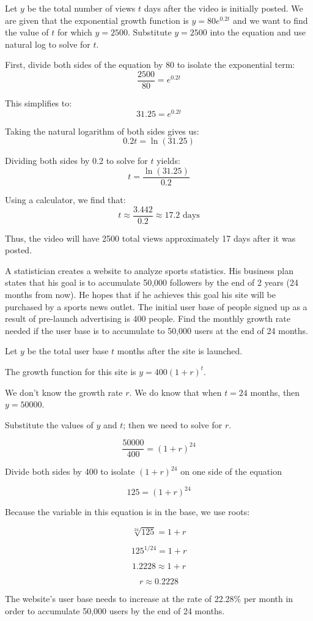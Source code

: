 \begin{solution}
    Let \( y \) be the total number of views \( t \) days after the video is initially posted. We are given that the exponential growth function is \( y = 80e^{0.2t} \) and we want to find the value of \( t \) for which \( y = 2500 \). Substitute \( y = 2500 \) into the equation and use natural log to solve for \( t \).

    First, divide both sides of the equation by 80 to isolate the exponential term:
    \[ \frac{2500}{80} = e^{0.2t} \]

    This simplifies to:
    \[ 31.25 = e^{0.2t} \]

    Taking the natural logarithm of both sides gives us:
    \[ 0.2t = \ln(31.25) \]

    Dividing both sides by 0.2 to solve for \( t \) yields:
    \[ t = \frac{\ln(31.25)}{0.2} \]

    Using a calculator, we find that:
    \[ t \approx \frac{3.442}{0.2} \approx 17.2 \text{ days} \]

    Thus, the video will have 2500 total views approximately 17 days after it was posted.
\end{solution}

\begin{example}
    A statistician creates a website to analyze sports statistics. His business plan states that his goal is to accumulate 50,000 followers by the end of 2 years (24 months from now). He hopes that if he achieves this goal his site will be purchased by a sports news outlet. The initial user base of people signed up as a result of pre-launch advertising is 400 people. Find the monthly growth rate needed if the user base is to accumulate to 50,000 users at the end of 24 months.
\end{example}

\begin{solution}
    Let \( y \) be the total user base \( t \) months after the site is launched.

    The growth function for this site is \( y = 400(1+r)^t \).

    We don’t know the growth rate \( r \). We do know that when \( t = 24 \) months, then \( y = 50000 \).

    Substitute the values of \( y \) and \( t \); then we need to solve for \( r \).

    \[ \frac{50000}{400} = (1+r)^{24} \]

    Divide both sides by 400 to isolate \( (1+r)^{24} \) on one side of the equation

    \[ 125 = (1+r)^{24} \]

    Because the variable in this equation is in the base, we use roots:

    \[ \sqrt[24]{125} = 1+r \]

    \[ 125^{1/24} = 1+r \]

    \[ 1.2228 \approx 1+r \]

    \[ r \approx 0.2228 \]

    The website’s user base needs to increase at the rate of 22.28\% per month in order to accumulate 50,000 users by the end of 24 months.
\end{solution}

